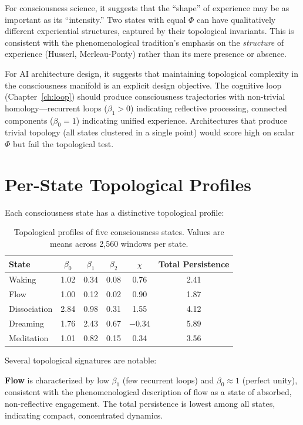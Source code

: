 \documentclass[12pt]{book}
\begin{document}
For consciousness science, it suggests that the ``shape'' of experience may be as important as its ``intensity.'' Two states with equal $\Phi$ can have qualitatively different experiential structures, captured by their topological invariants. This is consistent with the phenomenological tradition's emphasis on the \textit{structure} of experience (Husserl, Merleau-Ponty) rather than its mere presence or absence.

For AI architecture design, it suggests that maintaining topological complexity in the consciousness manifold is an explicit design objective. The cognitive loop (Chapter~\ref{ch:loop}) should produce consciousness trajectories with non-trivial homology---recurrent loops ($\beta_1 > 0$) indicating reflective processing, connected components ($\beta_0 = 1$) indicating unified experience. Architectures that produce trivial topology (all states clustered in a single point) would score high on scalar $\Phi$ but fail the topological test.

\section{Per-State Topological Profiles}

Each consciousness state has a distinctive topological profile:

\begin{table}[H]
\centering
\caption{Topological profiles of five consciousness states. Values are means across 2,560 windows per state.}
\label{tab:topo-profiles}
\begin{tabular}{lccccc}
\toprule
\textbf{State} & \textbf{$\beta_0$} & \textbf{$\beta_1$} & \textbf{$\beta_2$} & \textbf{$\chi$} & \textbf{Total Persistence} \\
\midrule
Waking & 1.02 & 0.34 & 0.08 & 0.76 & 2.41 \\
Flow & 1.00 & 0.12 & 0.02 & 0.90 & 1.87 \\
Dissociation & 2.84 & 0.98 & 0.31 & 1.55 & 4.12 \\
Dreaming & 1.76 & 2.43 & 0.67 & $-0.34$ & 5.89 \\
Meditation & 1.01 & 0.82 & 0.15 & 0.34 & 3.56 \\
\bottomrule
\end{tabular}
\end{table}

Several topological signatures are notable:

\textbf{Flow} is characterized by low $\beta_1$ (few recurrent loops) and $\beta_0 \approx 1$ (perfect unity), consistent with the phenomenological description of flow as a state of absorbed, non-reflective engagement. The total persistence is lowest among all states, indicating compact, concentrated dynamics.
\end{document}
